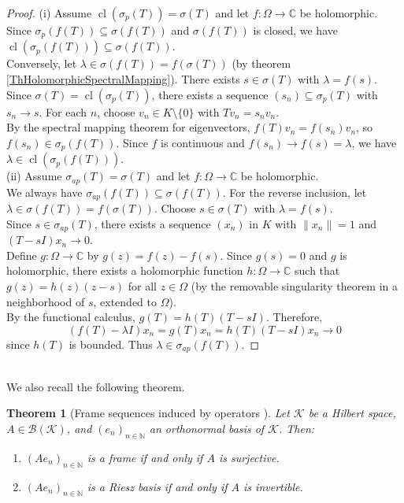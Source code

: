 \documentclass[a4paper,11pt]{article}
\theoremstyle{plain}
\newtheorem{theorem}{Theorem}[section]
\theoremstyle{definition}
\theoremstyle{remark}
\DeclareMathOperator{\cl}{cl}
\begin{document}
\begin{proof}
(i) Assume $\cl(\sigma_p(T)) = \sigma(T)$ and let $f: \Omega \to \mathbb{C}$ be holomorphic. \\
Since $\sigma_p(f(T)) \subseteq \sigma(f(T))$ and $\sigma(f(T))$ is closed, we have $\cl(\sigma_p(f(T))) \subseteq \sigma(f(T))$. \\
Conversely, let $\lambda \in \sigma(f(T)) = f(\sigma(T))$ (by theorem \ref{ThHolomorphicSpectralMapping}). There exists $s \in \sigma(T)$ with $\lambda = f(s)$. \\
Since $\sigma(T) = \cl(\sigma_p(T))$, there exists a sequence $(s_n) \subseteq \sigma_p(T)$ with $s_n \to s$. For each $n$, choose $v_n \in K \setminus \{0\}$ with $Tv_n = s_n v_n$. \\ 
By the spectral mapping theorem for eigenvectors, $f(T)v_n = f(s_n)v_n$, so $f(s_n) \in \sigma_p(f(T))$. Since $f$ is continuous and $f(s_n) \to f(s) = \lambda$, we have $\lambda \in \cl(\sigma_p(f(T)))$. \\
(ii) Assume $\sigma_{ap}(T) = \sigma(T)$ and let $f: \Omega \to \mathbb{C}$ be holomorphic. \\
We always have $\sigma_{ap}(f(T)) \subseteq \sigma(f(T))$. For the reverse inclusion, let $\lambda \in \sigma(f(T)) = f(\sigma(T))$. Choose $s \in \sigma(T)$ with $\lambda = f(s)$. \\
Since $s \in \sigma_{ap}(T)$, there exists a sequence $(x_n)$ in $K$ with $\|x_n\| = 1$ and $(T - sI)x_n \to 0$. \\
Define $g: \Omega \to \mathbb{C}$ by $g(z) = f(z) - f(s)$. Since $g(s) = 0$ and $g$ is holomorphic, there exists a holomorphic function $h: \Omega \to \mathbb{C}$ such that $g(z) = h(z)(z - s)$ for all $z \in \Omega$ (by the removable singularity theorem in a neighborhood of $s$, extended to $\Omega$). \\
By the functional calculus, $g(T) = h(T)(T - sI)$. Therefore,
\[(f(T) - \lambda I)x_n = g(T)x_n = h(T)(T - sI)x_n \to 0\]
since $h(T)$ is bounded. Thus $\lambda \in \sigma_{ap}(f(T))$.
\end{proof}

\mbox{} \\
We also recall the following theorem.

\begin{theorem}[Frame sequences induced by operators {\cite[Theorem~5.5.4]{Christensen2016}}]
\label{thm:Christensen}
Let $\mathcal{K}$ be a Hilbert space, $A \in \mathcal{B}(\mathcal{K})$, and
$(e_n)_{n\in\mathbb{N}}$ an orthonormal basis of $\mathcal{K}$. Then:
\begin{enumerate}
  \item $(Ae_n)_{n\in\mathbb{N}}$ is a frame if and only if $A$ is surjective.
  \item $(Ae_n)_{n\in\mathbb{N}}$ is a Riesz basis if and only if $A$ is invertible.
\end{enumerate}
\end{theorem}
\end{document}
